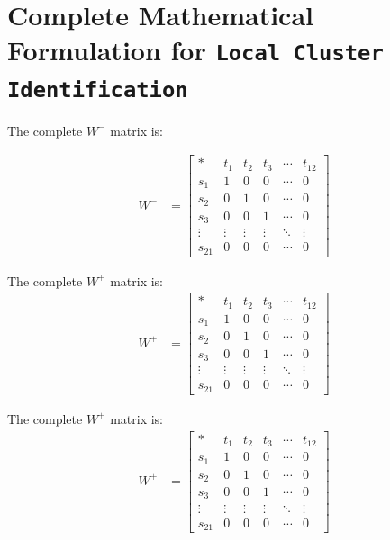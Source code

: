 \documentclass[12pt,a4paper]{article}
\begin{document}
\newpage
\appendix
\section{Complete Mathematical Formulation for \texttt{Local Cluster Identification}}
\label{app:cluster}

The complete \(W^{-}\) matrix is:

\begin{align*}
W^{-} &= \begin{bmatrix}
                * & t_1 & t_2 & t_3 & \cdots & t_{12} \\
                s_1 & 1 & 0 & 0 & \cdots & 0 \\
                s_2 & 0 & 1 & 0 & \cdots & 0 \\
                s_3 & 0 & 0 & 1 & \cdots & 0 \\
                \vdots & \vdots & \vdots & \vdots & \ddots & \vdots \\
                s_{21} & 0 & 0 & 0 & \cdots & 0
             \end{bmatrix}
\end{align*}

The complete \(W^{+}\) matrix is:
\begin{align*}
    W^{+} &= \begin{bmatrix}
                * & t_1 & t_2 & t_3 & \cdots & t_{12} \\
                s_1 & 1 & 0 & 0 & \cdots & 0 \\
                s_2 & 0 & 1 & 0 & \cdots & 0 \\
                s_3 & 0 & 0 & 1 & \cdots & 0 \\
                \vdots & \vdots & \vdots & \vdots & \ddots & \vdots \\
                s_{21} & 0 & 0 & 0 & \cdots & 0
             \end{bmatrix}
\end{align*}

The complete \(W^{+}\) matrix is:
\begin{align*}
    W^{+} &= \begin{bmatrix}
                * & t_1 & t_2 & t_3 & \cdots & t_{12} \\
                s_1 & 1 & 0 & 0 & \cdots & 0 \\
                s_2 & 0 & 1 & 0 & \cdots & 0 \\
                s_3 & 0 & 0 & 1 & \cdots & 0 \\
                \vdots & \vdots & \vdots & \vdots & \ddots & \vdots \\
                s_{21} & 0 & 0 & 0 & \cdots & 0
             \end{bmatrix}
\end{align*}
\end{document}
